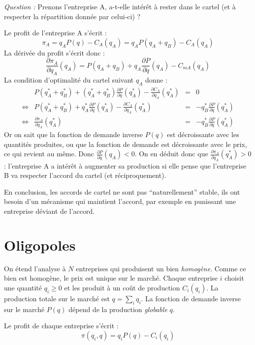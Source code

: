 \documentclass[
]{book}
\theoremstyle{definition}
\theoremstyle{definition}
\theoremstyle{definition}
\theoremstyle{definition}
\theoremstyle{remark}
\begin{document}
\emph{Question :} Prenons l'entreprise A, a-t-elle intérêt à rester dans le cartel (et à respecter la répartition donnée par celui-ci) ?

Le profit de l'entreprise A s'écrit :
\[
\pi_A=q_AP(q)-C_A(q_A)=q_AP(q_A+q_B)-C_A(q_A)
\]
La dérivée du profit s'écrit donc :
\[
\frac{\partial\pi_A}{\partial q_A}(q_A)=P(q_A+q_B)+q_A\frac{\partial P}{\partial q}(q_A)-C_{mA}(q_A)
\]
La condition d'optimalité du cartel suivant \(q_A\) donne :
\[
\begin{array}{crcl}
& P(q_A^*+q_B^*) + (q_A^*+q_B^*)\frac{\partial P}{\partial q}(q_A^*)-\frac{\partial C_A}{\partial q_A}(q_A^*)& = &0\\
\Leftrightarrow &  P(q_A^*+q_B^*) + q_A^*\frac{\partial P}{\partial q}(q_A^*)-\frac{\partial C_A}{\partial q_A}(q_A^*)& = &-q_B^*\frac{\partial P}{\partial q}(q_A^*)\\
\Leftrightarrow & \frac{\partial\pi_A}{\partial q_A}(q_A^*)& =  &-q_B^*\frac{\partial P}{\partial q}(q_A^*)
 \end{array}
\]
Or on sait que la fonction de demande inverse \(P(q)\) est décroissante avec les quantités produites, ou que la fonction de demande est décroissante avec le prix, ce qui revient au même.
Donc \(\frac{\partial P}{\partial q}(q_A)<0\).
On en déduit donc que \(\frac{\partial\pi_A}{\partial q_A}(q_A^*)>0\) : l'entreprise A a intérêt à augmenter sa production si elle pense que l'entreprise B va respecter l'accord du cartel (et réciproquement).

En conclusion, les accords de cartel ne sont pas ``naturellement'' stable, ils ont besoin d'un mécanisme qui maintient l'accord, par exemple en punissant une entreprise déviant de l'accord.

\hypertarget{oligopoles-1}{%
\section{Oligopoles}\label{oligopoles-1}}

On étend l'analyse à \(N\) entreprises qui produisent un bien \emph{homogène}.
Comme ce bien est homogène, le prix est unique sur le marché.
Chaque entreprise \(i\) choisit une quantité \(q_i\geq 0\) et les produit à un coût de production \(C_i(q_i)\).
La production totale sur le marché est \(q=\sum_i q_i\).
La fonction de demande inverse sur le marché \(P(q)\) dépend de la production \emph{globable} \(q\).

Le profit de chaque entreprise s'écrit :
\[
\pi(q_i, q) = q_iP(q) -C_i(q_i)
\]
\end{document}
